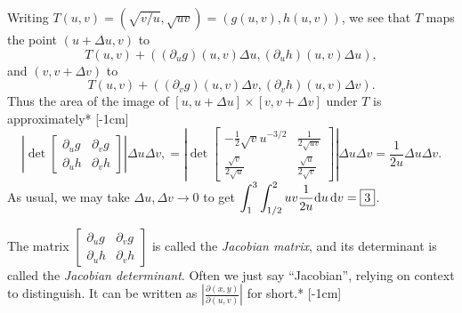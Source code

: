 \documentclass{watsonbook}
\begin{document}
\begin{solution}
  Writing $T(u,v) =
  (\sqrt{v/u}, \sqrt{uv}) = (g(u,v), h(u,v))$, we see that $T$ maps
  the point $(u+\Delta u, v)$ to
  \begin{equation} \label{eq:Tv}
    T(u,v) + ((\partial_u g)(u,v) \Delta u,
    (\partial_u h)(u,v) \Delta u), 
  \end{equation}
  and
  $(v, v+\Delta v)$ to
  \begin{equation} \label{eq:Tu}
    T(u,v) + ((\partial_v g)(u,v) \Delta v,
    (\partial_v h)(u,v) \Delta v). 
  \end{equation}
  Thus the area of the image of $[u, u+\Delta u] \times [v, v + \Delta
  v]$ under $T$ is approximately* [-1cm]
  \[
    \left| \det \left[
      \begin{array}{cc}
        \partial_u g & \partial _v g \\
        \partial_u h & \partial _v h
      \end{array} \right]
    \right| \Delta u \Delta v,  =
    \left| \det \left[
      \begin{array}{cc}
        -\frac{1}{2}\sqrt{v}u^{-3/2} & \frac{1}{2\sqrt{uv}} \\
        \frac{\sqrt{v}}{2\sqrt{u}} & \frac{\sqrt{u}}{2\sqrt{v}}
      \end{array} \right]
      \right| \Delta u \Delta v  = \frac{1}{2u}
      \Delta u \Delta v. 
    \]
    As usual, we may take $\Delta u, \Delta v \to 0$ to get 
    $\displaystyle{\int_{1}^{3}\int_{1/2}^{2}uv \frac{1}{2u}  
    \mathrm{d}u \, {\mathrm{d}}v = \boxed{3}}$. 
  \end{solution}

  The matrix $\left[
      \begin{array}{cc}
        \partial_u g & \partial _v g \\
        \partial_u h & \partial _v h
      \end{array} \right]$ is called the \textit{Jacobian matrix}, and
    its determinant is called the \textit{Jacobian determinant}. Often we just say
    ``Jacobian'', relying on context to distinguish. It can be written
    as $\left|\frac{\partial (x,y)}{\partial (u,v)} \right|$ for
    short.* [-1cm]
    
\end{document}
